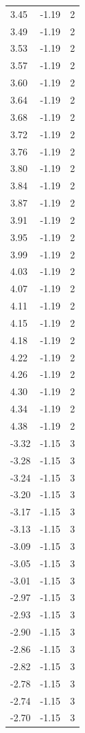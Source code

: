 \begin{longtable}{lrr}
  3.45 & -1.19 & 2 \\
  3.49 & -1.19 & 2 \\
  3.53 & -1.19 & 2 \\
  3.57 & -1.19 & 2 \\
  3.60 & -1.19 & 2 \\
  3.64 & -1.19 & 2 \\
  3.68 & -1.19 & 2 \\
  3.72 & -1.19 & 2 \\
  3.76 & -1.19 & 2 \\
  3.80 & -1.19 & 2 \\
  3.84 & -1.19 & 2 \\
  3.87 & -1.19 & 2 \\
  3.91 & -1.19 & 2 \\
  3.95 & -1.19 & 2 \\
  3.99 & -1.19 & 2 \\
  4.03 & -1.19 & 2 \\
  4.07 & -1.19 & 2 \\
  4.11 & -1.19 & 2 \\
  4.15 & -1.19 & 2 \\
  4.18 & -1.19 & 2 \\
  4.22 & -1.19 & 2 \\
  4.26 & -1.19 & 2 \\
  4.30 & -1.19 & 2 \\
  4.34 & -1.19 & 2 \\
  4.38 & -1.19 & 2 \\
  -3.32 & -1.15 & 3 \\
  -3.28 & -1.15 & 3 \\
  -3.24 & -1.15 & 3 \\
  -3.20 & -1.15 & 3 \\
  -3.17 & -1.15 & 3 \\
  -3.13 & -1.15 & 3 \\
  -3.09 & -1.15 & 3 \\
  -3.05 & -1.15 & 3 \\
  -3.01 & -1.15 & 3 \\
  -2.97 & -1.15 & 3 \\
  -2.93 & -1.15 & 3 \\
  -2.90 & -1.15 & 3 \\
  -2.86 & -1.15 & 3 \\
  -2.82 & -1.15 & 3 \\
  -2.78 & -1.15 & 3 \\
  -2.74 & -1.15 & 3 \\
  -2.70 & -1.15 & 3 \\

\end{longtable}
